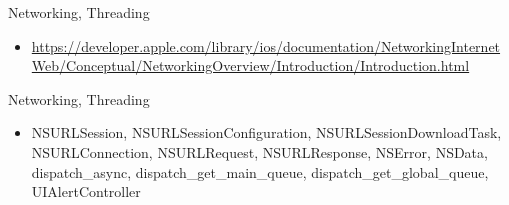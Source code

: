 \documentclass{beamer}
\begin{document}
\begin{frame}{Networking, Threading}
    \begin{itemize}
    \item {
        \url {https://developer.apple.com/library/ios/documentation/NetworkingInternetWeb/Conceptual/NetworkingOverview/Introduction/Introduction.html}
    }
    \end{itemize}
\end{frame}

\begin{frame}{Networking, Threading}
    \begin{itemize}
    \item {
        NSURLSession, NSURLSessionConfiguration, NSURLSessionDownloadTask, NSURLConnection, NSURLRequest, NSURLResponse, NSError, NSData, dispatch\_async, dispatch\_get\_main\_queue, dispatch\_get\_global\_queue, UIAlertController
    }
    \end{itemize}
\end{frame}
\end{document}
